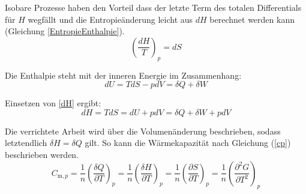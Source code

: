 \documentclass[12pt,a4paper,titlepage,headinclude,bibtotoc]{scrartcl}
\begin{document}
Isobare Prozesse haben den Vorteil dass der letzte Term des totalen Differentials für $H$ wegfällt und die Entropieänderung leicht aus $dH$ berechnet werden kann (Gleichung \ref{EntropieEnthalpie}).\\


\begin{equation} \label{EntropieEnthalpie}
\left(\frac{dH}{T}\right)_p = dS
\end{equation}

Die Enthalpie steht mit der inneren Energie im Zusammenhang:\\

\begin{equation}
dU= TdS -pdV = \delta Q +\delta W
\end{equation}

Einsetzen von \ref{dH} ergibt:\\
\begin{equation}
dH =TdS =dU+ pdV = \delta Q + \delta W +pdV
\end{equation}

Die verrichtete Arbeit wird über die Volumenänderung beschrieben, sodass letztendlich $\delta H = \delta Q$ gilt. So kann die Wärmekapazität nach Gleichung (\ref{cp}) beschrieben werden.\\

\begin{equation} \label{cp}
C_{\mathrm{m},p} =\frac{1}{n} \left(\frac{\delta Q}{\partial T}\right)_p =\frac{1}{n} \left(\frac{\delta H}{\partial T}\right)_p = \frac{1}{n} \left(\frac{\partial S}{\partial T}\right)_p= \frac{1}{n} \left(\frac{\partial^2 G}{\partial T^2}\right)_p
\end{equation}





\end{document}
